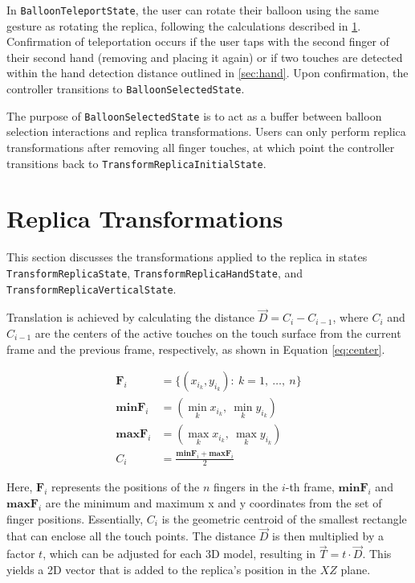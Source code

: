     In \lstinline{BalloonTeleportState}, the user can rotate their balloon using the same gesture as rotating the replica, following the calculations described in \ref{sec:transformation}. Confirmation of teleportation occurs if the user taps with the second finger of their second hand (removing and placing it again) or if two touches are detected within the hand detection distance outlined in \ref{sec:hand}. Upon confirmation, the controller transitions to \lstinline{BalloonSelectedState}.
    
    The purpose of \lstinline{BalloonSelectedState} is to act as a buffer between balloon selection interactions and replica transformations. Users can only perform replica transformations after removing all finger touches, at which point the controller transitions back to \lstinline{TransformReplicaInitialState}.


\section{Replica Transformations} \label{sec:transformation}

    This section discusses the transformations applied to the replica in states \lstinline{TransformReplicaState}, \lstinline{TransformReplicaHandState}, and \lstinline{TransformReplicaVerticalState}.
    
    Translation is achieved by calculating the distance \(\vec{D} = C_{i} - C_{i-1}\), where \(C_{i}\) and \(C_{i-1}\) are the centers of the active touches on the touch surface from the current frame and the previous frame, respectively, as shown in Equation \ref{eq:center}.

    \begin{figure}[h]
    \begin{equation}
    \begin{split} \label{eq:center}
        \mathbf{F}_i &= \{(x_{i_k}, y_{i_k}) :\ k = 1,\ \dots,\ n\} \\
        \mathbf{minF}_i &= (\min_{k} x_{i_k},\ \min_{k} y_{i_k}) \\
        \mathbf{maxF}_i &= (\max_{k} x_{i_k},\ \max_{k} y_{i_k}) \\
        C_i &= \frac{\mathbf{minF}_i + \mathbf{maxF}_i}{2}
    \end{split}
    \end{equation}
    \end{figure}

    Here, \(\mathbf{F}_i\) represents the positions of the \(n\) fingers in the \(i\)-th frame, \(\mathbf{minF}_i\) and \(\mathbf{maxF}_i\) are the minimum and maximum x and y coordinates from the set of finger positions. Essentially, \(C_i\) is the geometric centroid of the smallest rectangle that can enclose all the touch points. The distance $\vec{D}$ is then multiplied by a factor \(t\), which can be adjusted for each 3D model, resulting in \(\vec{T} = t \cdot \vec{D}\). This yields a 2D vector that is added to the replica's position in the \(XZ\) plane.

